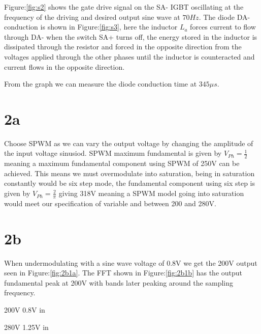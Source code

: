 \documentclass{article}
\begin{document}
Figure:\ref{fig:s2} shows the gate drive signal on the SA- IGBT oscillating at the frequency of the driving and desired output sine wave at $70Hz$. The diode DA- conduction is shown in Figure:\ref{fig:s3}, here the inductor $L_a$ forces current to flow through DA- when the switch SA+ turns off, the energy stored in the inductor is dissipated through the resistor and forced in the opposite direction from the voltages applied through the other phases until the inductor is counteracted and current flows in the opposite direction. 

From the graph we can measure the diode conduction time at $345\mu s$.

\section*{2a} 
Choose SPWM as we can vary the output voltage by changing the amplitude of the input voltage sinusiod. SPWM maximum fundamental is given by $V_{Ph}=\frac{1}{2}$ meaning a maximum fundamental component using SPWM of 250V can be achieved. This means we must overmodulate into saturation, being in saturation constantly would be six step mode, the fundamental component using six step is given by $V_{Ph}=\frac{2 }{\pi}$ giving 318V meaning a SPWM model going into saturation would meet our specification of variable and between 200 and 280V.

\section*{2b} 
When undermodulating with a sine wave voltage of 0.8V we get the 200V output seen in Figure:\ref{fig:2b1a}. The FFT shown in Figure:\ref{fig:2b1b} has the output fundamental peak at 200V with bands later peaking around the sampling frequency.

200V 0.8V in

280V 1.25V in
\end{document}
